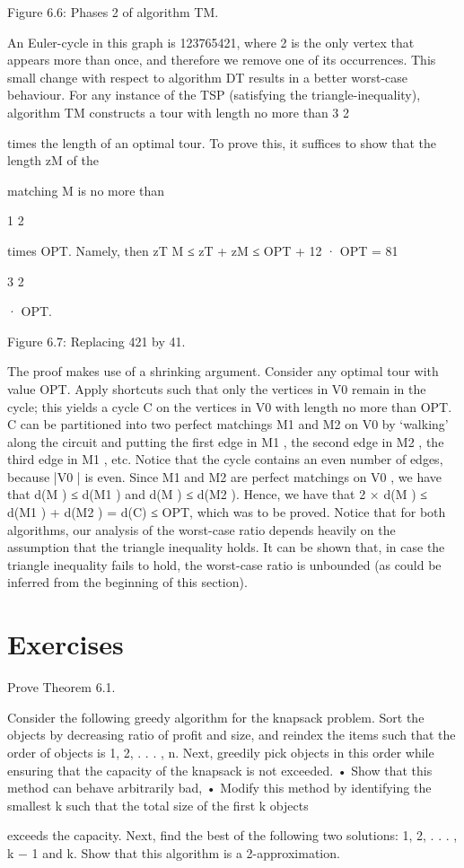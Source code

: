 Figure 6.6: Phases 2 of algorithm TM.

An Euler-cycle in this graph is 123765421, where 2 is the only vertex that appears more than once, and
therefore we remove one of its occurrences.
This small change with respect to algorithm DT results in a better worst-case behaviour. For any instance
of the TSP (satisfying the triangle-inequality), algorithm TM constructs a tour with length no more than
3
2

times the length of an optimal tour. To prove this, it suffices to show that the length zM of the

matching M is no more than

1
2

times OPT. Namely, then zT M ≤ zT + zM ≤ OPT + 12 · OPT =
81

3
2

· OPT.

Figure 6.7: Replacing 421 by 41.

The proof makes use of a shrinking argument. Consider any optimal tour with value OPT. Apply
shortcuts such that only the vertices in V0 remain in the cycle; this yields a cycle C on the vertices in
V0 with length no more than OPT. C can be partitioned into two perfect matchings M1 and M2 on V0
by ‘walking' along the circuit and putting the first edge in M1 , the second edge in M2 , the third edge in
M1 , etc. Notice that the cycle contains an even number of edges, because |V0 | is even.
Since M1 and M2 are perfect matchings on V0 , we have that d(M ) ≤ d(M1 ) and d(M ) ≤ d(M2 ). Hence,
we have that 2 × d(M ) ≤ d(M1 ) + d(M2 ) = d(C) ≤ OPT, which was to be proved.
Notice that for both algorithms, our analysis of the worst-case ratio depends heavily on the assumption
that the triangle inequality holds. It can be shown that, in case the triangle inequality fails to hold, the
worst-case ratio is unbounded (as could be inferred from the beginning of this section).

\section*{Exercises}
\begin{exercise}
Prove Theorem 6.1.
\end{exercise}

\begin{exercise}
Consider the following greedy algorithm for the knapsack problem. Sort the objects by decreasing ratio
of profit and size, and reindex the items such that the order of objects is 1, 2, . . . , n. Next, greedily pick
objects in this order while ensuring that the capacity of the knapsack is not exceeded.
• Show that this method can behave arbitrarily bad,
• Modify this method by identifying the smallest k such that the total size of the first k objects

exceeds the capacity. Next, find the best of the following two solutions: {1, 2, . . . , k − 1} and {k}.
Show that this algorithm is a 2-approximation.
\end{exercise}

